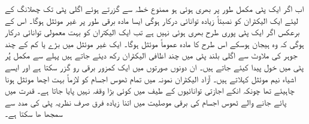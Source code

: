  اب اگر ایک پٹی مکمل طور پر بھری ہوئی ہو ممنوع خطہ سے گزرتے ہوئے اگلی پٹی تک چھلانگ کے لیئے ایک الیکٹران کو نصبتاً زیادہ توانائی درکار ہوگی ایسا مادہ برقی طور پر غیر موئثل ہوگا۔ اس کے برعکس اگر ایک پٹی پوری طرح بھری ہوئی نہیں ہے تب ایک الیکتران کو بہت معمولی توانائی درکار ہوگی کہ وہ ہیجان ہوسکے  اس طرح کا مادہ عموماً موئثل ہوگا۔ ایک غیر موئثل میں بڑے یا کم  کے چند جوہر کی ملاوٹ سے اگلی بلند پٹی میں چند اظافی الیکٹران رکھ دیئے جاتے ہیں پہلے سے مکمل پُر پٹی میں خول پیدا کیئے جاتے ہیں۔ ان دونوں صورتوں میں ایک کمزور برقی رو گزر سکتا ہے اور ایسے اشیاء نیم موئثل کہلاتے ہیں۔ آزاد الیکٹران نمونہ میں تمام ٹھوس اجسام کو لازماً بہت اچھا موئثل ہونا چاہیئے تھا چونکہ انکے اجازتی توانائیوں کے طیف میں کوئی بڑا وقفہ نہیں پایا جاتا ہے۔ قدرت میں پائے جانے والے ٹھوس اجسام کی برقی موصلیت میں اتنا زیادہ فرق صرف نظریہ پٹی کی مدد سے سمجھا ھا سکتا ہے۔  

